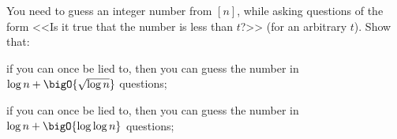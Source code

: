 You need to guess an integer number from $[n]$, while asking questions of the form <<Is it true that the
number is less than $t$?>> (for an arbitrary $t$). Show that:
\begin{enumlet}
    \item if you can once be lied to, then you can guess the number in $\log n + \bigO{\sqrt{\log n}}$
        questions; 
    \item if you can once be lied to, then you can guess the number in $\log n + \bigO{\log\log n}$
        questions;
\end{enumlet}
